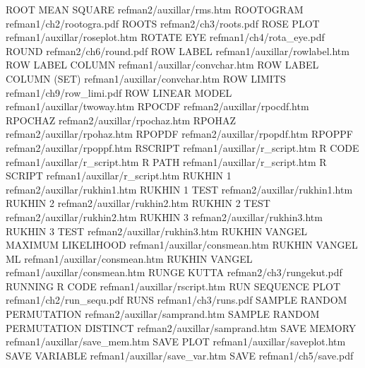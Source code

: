 ROOT MEAN SQUARE                        refman2/auxillar/rms.htm
ROOTOGRAM                               refman1/ch2/rootogra.pdf
ROOTS                                   refman2/ch3/roots.pdf
ROSE PLOT                               refman1/auxillar/roseplot.htm
ROTATE EYE                              refman1/ch4/rota_eye.pdf
ROUND                                   refman2/ch6/round.pdf
ROW LABEL                               refman1/auxillar/rowlabel.htm
ROW LABEL COLUMN                        refman1/auxillar/convchar.htm
ROW LABEL COLUMN (SET)                  refman1/auxillar/convchar.htm
ROW LIMITS                              refman1/ch9/row_limi.pdf
ROW LINEAR MODEL                        refman1/auxillar/twoway.htm
RPOCDF                                  refman2/auxillar/rpocdf.htm
RPOCHAZ                                 refman2/auxillar/rpochaz.htm
RPOHAZ                                  refman2/auxillar/rpohaz.htm
RPOPDF                                  refman2/auxillar/rpopdf.htm
RPOPPF                                  refman2/auxillar/rpoppf.htm
RSCRIPT                                 refman1/auxillar/r_script.htm
R CODE                                  refman1/auxillar/r_script.htm
R PATH                                  refman1/auxillar/r_script.htm
R SCRIPT                                refman1/auxillar/r_script.htm
RUKHIN 1                                refman2/auxillar/rukhin1.htm
RUKHIN 1 TEST                           refman2/auxillar/rukhin1.htm
RUKHIN 2                                refman2/auxillar/rukhin2.htm
RUKHIN 2 TEST                           refman2/auxillar/rukhin2.htm
RUKHIN 3                                refman2/auxillar/rukhin3.htm
RUKHIN 3 TEST                           refman2/auxillar/rukhin3.htm
RUKHIN VANGEL MAXIMUM LIKELIHOOD        refman1/auxillar/consmean.htm
RUKHIN VANGEL ML                        refman1/auxillar/consmean.htm
RUKHIN VANGEL                           refman1/auxillar/consmean.htm
RUNGE KUTTA                             refman2/ch3/rungekut.pdf
RUNNING R CODE                          refman1/auxillar/rscript.htm
RUN SEQUENCE PLOT                       refman1/ch2/run_sequ.pdf
RUNS                                    refman1/ch3/runs.pdf
SAMPLE RANDOM PERMUTATION               refman2/auxillar/samprand.htm
SAMPLE RANDOM PERMUTATION DISTINCT      refman2/auxillar/samprand.htm
SAVE MEMORY                             refman1/auxillar/save_mem.htm
SAVE PLOT                               refman1/auxillar/saveplot.htm
SAVE VARIABLE                           refman1/auxillar/save_var.htm
SAVE                                    refman1/ch5/save.pdf
